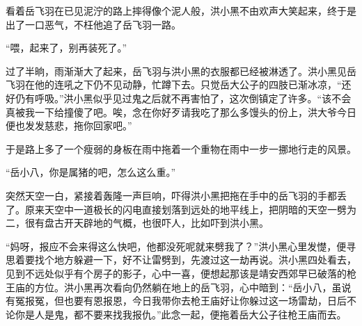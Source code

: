 看着岳飞羽在已见泥泞的路上摔得像个泥人般，洪小黑不由欢声大笑起来，终于是出了一口恶气，不枉他追了岳飞羽一路。

“喂，起来了，别再装死了。”

过了半晌，雨渐渐大了起来，岳飞羽与洪小黑的衣服都已经被淋透了。洪小黑见岳飞羽在他的连吼之下仍不见动静，忙蹲下去。只觉岳大公子的四肢已渐冰凉，“还好仍有呼吸。”洪小黑似乎见过鬼之后就不再害怕了，这次倒镇定了许多。“该不会真被我一下给撞傻了吧。唉，念在你好歹请我吃了那么多馒头的份上，洪大爷今日便也发发慈悲，拖你回家吧。”

于是路上多了一个瘦弱的身板在雨中拖着一个重物在雨中一步一挪地行走的风景。

“岳小八，你是属猪的吧，怎么这么重。”

突然天空一白，紧接着轰隆一声巨响，吓得洪小黑把拖在手中的岳飞羽的手都丢了。原来天空中一道极长的闪电直接划落到远处的地平线上，把阴暗的天空一劈为二，很有盘古开天辟地的气概，也很吓人，比如吓到洪小黑。

“妈呀，报应不会来得这么快吧，他都没死呢就来劈我了？”洪小黑心里发憷，便寻思着要找个地方躲避一下，好不让雷劈到，先渡过这一劫再说。洪小黑四处看去，见到不远处似乎有个房子的影子，心中一喜，便想起那该是靖安西郊早已破落的枪王庙的方位。洪小黑再次看向仍然躺在地上的岳飞羽，心中暗到：“岳小八，虽说有冤报冤，但也要有恩报恩，今日我带你去枪王庙好让你躲过这一场雷劫，日后不论你是人是鬼，都不要来找我报仇。”此念一起，便拖着岳大公子往枪王庙而去。


